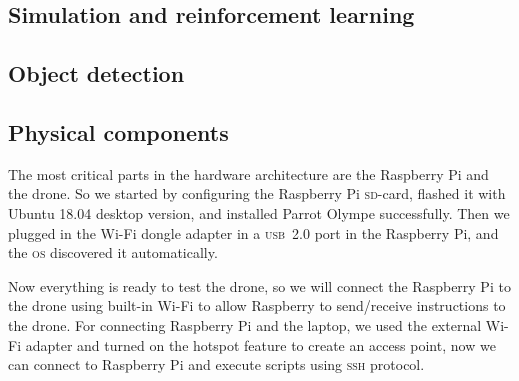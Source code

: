 \documentclass[../main.tex]{subfiles}
\begin{document}
\subsection{Simulation and reinforcement learning}





\lipsum[1]

\subsection{Object detection}

\lipsum[1]

\subsection{Physical components}

The most critical parts in the hardware
architecture are the Raspberry Pi and the drone. 
So we started by configuring the Raspberry Pi 
\textsc{sd}-card,
flashed it with Ubuntu 18.04 desktop version,
and installed Parrot Olympe successfully. 
Then we plugged in the Wi-Fi dongle adapter
in a \textsc{usb}~2.0 port in the Raspberry Pi, 
and the \textsc{os} discovered it automatically. 

Now everything is ready to test the 
\anafi drone, so we will connect the
Raspberry Pi to the drone using built-in Wi-Fi
to allow Raspberry to send/receive instructions
to the drone. 
For connecting Raspberry Pi and the laptop, 
we used the external Wi-Fi adapter and turned on the hotspot feature to create an access point,
now we can connect to Raspberry Pi and execute 
scripts using \textsc{ssh} protocol.
\end{document}
